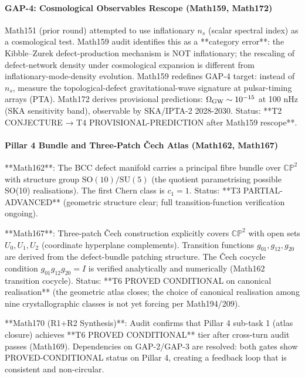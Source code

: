 \paragraph{GAP-4: Cosmological Observables Rescope (Math159, Math172)}
Math151 (prior round) attempted to use inflationary $n_s$ (scalar spectral
index) as a cosmological test. Math159 audit identifies this as a **category error**:
the Kibble--Zurek defect-production mechanism is NOT inflationary; the rescaling
of defect-network density under cosmological expansion is different from
inflationary-mode-density evolution. Math159 redefines GAP-4 target: instead of
$n_s$, measure the topological-defect gravitational-wave signature at pulsar-timing
arrays (PTA). Math172 derives provisional predictions: $\Omega_{\rm GW} \sim
10^{-15}$ at 100 nHz (SKA sensitivity band), observable by SKA/IPTA-2 2028-2030.
Status: **T2 CONJECTURE → T4 PROVISIONAL-PREDICTION after Math159 rescope**.

\paragraph{Pillar 4 Bundle and Three-Patch Čech Atlas (Math162, Math167)}
**Math162**: The BCC defect manifold carries a principal fibre bundle over
$\mathbb{CP}^2$ with structure group $\mathrm{SO}(10)/\mathrm{SU}(5)$ (the quotient
parametrising possible SO(10) realisations). The first Chern class is $c_1 = 1$.
Status: **T3 PARTIAL-ADVANCED** (geometric structure clear; full transition-function
verification ongoing).

**Math167**: Three-patch Čech construction explicitly covers $\mathbb{CP}^2$ with
open sets $U_0, U_1, U_2$ (coordinate hyperplane complements). Transition functions
$g_{01}, g_{12}, g_{20}$ are derived from the defect-bundle patching structure.
The Čech cocycle condition $g_{01} g_{12} g_{20} = I$ is verified analytically
and numerically (Math162 transition cocycle). Status: **T6 PROVED CONDITIONAL on
canonical realisation** (the geometric atlas closes; the choice of canonical
realisation among nine crystallographic classes is not yet forcing per Math194/209).

**Math170 (R1+R2 Synthesis)**: Audit confirms that Pillar 4 sub-task 1 (atlas
closure) achieves **T6 PROVED CONDITIONAL** tier after cross-turn audit passes
(Math169). Dependencies on GAP-2/GAP-3 are resolved: both gates show
PROVED-CONDITIONAL status on Pillar 4, creating a feedback loop that is consistent
and non-circular.

